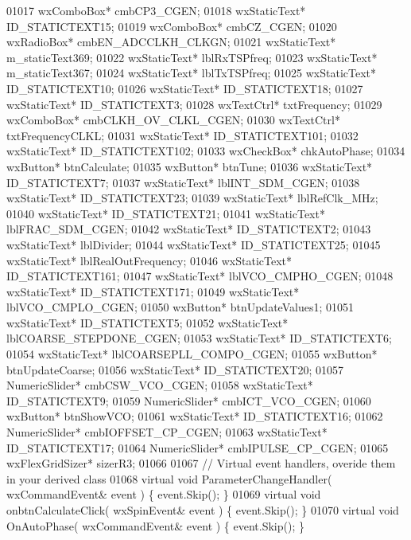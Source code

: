 \begin{DoxyCode}
01017         wxComboBox* cmbCP3_CGEN;
01018         wxStaticText* ID_STATICTEXT15;
01019         wxComboBox* cmbCZ_CGEN;
01020         wxRadioBox* cmbEN_ADCCLKH_CLKGN;
01021         wxStaticText* m_staticText369;
01022         wxStaticText* lblRxTSPfreq;
01023         wxStaticText* m_staticText367;
01024         wxStaticText* lblTxTSPfreq;
01025         wxStaticText* ID_STATICTEXT10;
01026         wxStaticText* ID_STATICTEXT18;
01027         wxStaticText* ID_STATICTEXT3;
01028         wxTextCtrl* txtFrequency;
01029         wxComboBox* cmbCLKH_OV_CLKL_CGEN;
01030         wxTextCtrl* txtFrequencyCLKL;
01031         wxStaticText* ID_STATICTEXT101;
01032         wxStaticText* ID_STATICTEXT102;
01033         wxCheckBox* chkAutoPhase;
01034         wxButton* btnCalculate;
01035         wxButton* btnTune;
01036         wxStaticText* ID_STATICTEXT7;
01037         wxStaticText* lblINT_SDM_CGEN;
01038         wxStaticText* ID_STATICTEXT23;
01039         wxStaticText* lblRefClk_MHz;
01040         wxStaticText* ID_STATICTEXT21;
01041         wxStaticText* lblFRAC_SDM_CGEN;
01042         wxStaticText* ID_STATICTEXT2;
01043         wxStaticText* lblDivider;
01044         wxStaticText* ID_STATICTEXT25;
01045         wxStaticText* lblRealOutFrequency;
01046         wxStaticText* ID_STATICTEXT161;
01047         wxStaticText* lblVCO_CMPHO_CGEN;
01048         wxStaticText* ID_STATICTEXT171;
01049         wxStaticText* lblVCO_CMPLO_CGEN;
01050         wxButton* btnUpdateValues1;
01051         wxStaticText* ID_STATICTEXT5;
01052         wxStaticText* lblCOARSE_STEPDONE_CGEN;
01053         wxStaticText* ID_STATICTEXT6;
01054         wxStaticText* lblCOARSEPLL_COMPO_CGEN;
01055         wxButton* btnUpdateCoarse;
01056         wxStaticText* ID_STATICTEXT20;
01057         NumericSlider* cmbCSW_VCO_CGEN;
01058         wxStaticText* ID_STATICTEXT9;
01059         NumericSlider* cmbICT_VCO_CGEN;
01060         wxButton* btnShowVCO;
01061         wxStaticText* ID_STATICTEXT16;
01062         NumericSlider* cmbIOFFSET_CP_CGEN;
01063         wxStaticText* ID_STATICTEXT17;
01064         NumericSlider* cmbIPULSE_CP_CGEN;
01065         wxFlexGridSizer* sizerR3;
01066         
01067         \textcolor{comment}{// Virtual event handlers, overide them in your derived class}
01068         \textcolor{keyword}{virtual} \textcolor{keywordtype}{void} ParameterChangeHandler( wxCommandEvent& event ) \{ \textcolor{keyword}{event}.Skip(); \}
01069         \textcolor{keyword}{virtual} \textcolor{keywordtype}{void} onbtnCalculateClick( wxSpinEvent& event ) \{ \textcolor{keyword}{event}.Skip(); \}
01070         \textcolor{keyword}{virtual} \textcolor{keywordtype}{void} OnAutoPhase( wxCommandEvent& event ) \{ \textcolor{keyword}{event}.Skip(); \}

\end{DoxyCode}
